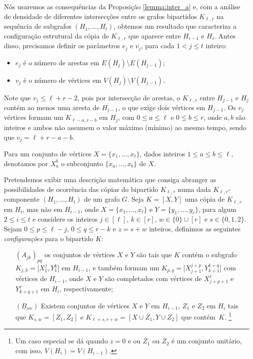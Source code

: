 \documentclass[12pt,a4paper]{book}
\newcommand{\K}{K_{\ell,r}} %
\begin{document}
      Nós usaremos as consequências da Proposição \ref{lemma:inter_a} e, com a análise de densidade de diferentes intersecções entre  os grafos bipartidos $\K$ na sequência de subgrafos $(H_1, \ldots, H_t)$, obtemos um resultado que caracteriza a configuração estrutural da cópia de $\K$ que aparece entre $H_{i-1}$ e $H_i$.
     Antes disso, precisamos definir os parâmetros $e_j$ e $v_j$, para cada  $1 < j \leq t$ inteiro:
     \begin{itemize}
         \item $e_j$ é o número de arestas em $E(H_{j}) \setminus E(H_{j-1})$;
         \item $v_j$ é o número de vértices em $V(H_{j}) \setminus V(H_{j-1})$. 
     \end{itemize}
     
     Note que $v_j \leq \ell+r-2$, pois por intersecção de arestas, o $\K$ entre $H_{j-1}$ e $H_{j}$ contém ao menos uma aresta de $H_{j-1}$, o que exige dois vértices em $H_{j-1}$. 
     Os $v_{j}$ vértices formam um $K_{\ell-a,r-b}$ em $H_{j}$, com $0 \leq a\leq \ell$ e $0\leq b\leq r$, onde $a,b$ são inteiros e ambos não assumem o valor máximo (mínimo) ao mesmo tempo, sendo que $v_{j} = \ell+r-a-b$.
 

  Para um conjunto de vértices $X = \{x_1, \ldots, x_\ell\}$, dados inteiros $1 \leq a \leq b \leq \ell$, denotamos por $X_a^b$ o subconjunto $\{x_a, \ldots, x_b\}$ de $X$. 

    Pretendemos exibir uma descrição matemática que consiga abranger as possibilidades de ocorrência das cópias do bipartido $\K$ numa dada $\K$-componente $(H_1, \ldots, H_t)$ de um grafo $G$.
    Seja $K = [X, Y]$ uma cópia de $\K$ em $H_i$, mas não em $H_{i-1}$, 
    onde $X = \{x_1, \ldots, x_\ell\}$ e $Y=\{y_1, \ldots, y_r\}$, para algum $2\leq i\leq t$
    e considere os inteiros $j\in [\ell]$, $k \in [r]$, $w \in \{0\}\cup [r]$ e $s \in\{0,1,2\}$.  
    Sejam $0 \leq p \leq \ell-j$, $0\leq q \leq r -k$ e $z = s+w$ inteiros, 
     definimos as seguintes \emph{configurações} para o bipartido $K$: 
     
     \begin{enumerate}
       \item[\hypertarget{HconfigA}{$(A_{jk})_{pq}$}] \label{configA} 
        os conjuntos de vértices $X$ e $Y$ são tais que $K$
    contém o subgrafo
    $K_{j,k} = \big[X_1^j, Y_1^k\big]$ em $H_{i-1}$, 
    e também formam um 
    $K_{p,q} = \big[X_{j+1}^{j+p}, Y_{k+1}^{k+q}\big]$
    com  vértices de $H_{i-1}$, onde $X$ e $Y$ são completados com vértices de
    $X_{j+p+1}^\ell$ 
    e
    $Y_{k+q+1}^r$ 
    em $H_i$, respectivamente;
                
       \item[\hypertarget{HconfigB}{$(B_{sw})$}]\label{configB} 
        Existem conjuntos de vértices $X$ e $Y$ em $H_{i-1}$, $Z_1$ e $Z_2$ em $H_i$ tais que
      $K_{s,w} = [Z_1, Z_2]$ e 
      $K_{\ell+s,r+w}= [X\cup Z_1, Y\cup Z_2]$ que contém~$K$.
      \footnote[1]{Um caso especial se dá quando $z = 0$ e 
     ou $Z_1$ ou $Z_2$ é um conjunto unitário, com isso, $V(H_i) = V(H_{i-1})$.}
       \end{enumerate}
  
\end{document}

